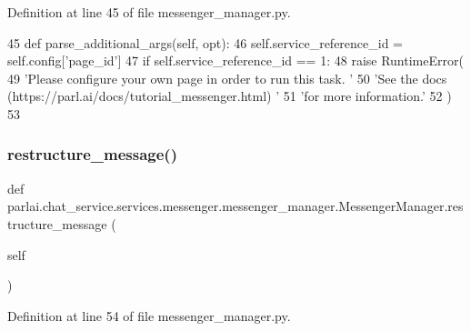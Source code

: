 Definition at line 45 of file messenger\+\_\+manager.\+py.


\begin{DoxyCode}
45     \textcolor{keyword}{def }parse\_additional\_args(self, opt):
46         self.service\_reference\_id = self.config[\textcolor{stringliteral}{'page\_id'}]
47         \textcolor{keywordflow}{if} self.service\_reference\_id == 1:
48             \textcolor{keywordflow}{raise} RuntimeError(
49                 \textcolor{stringliteral}{'Please configure your own page in order to run this task. '}
50                 \textcolor{stringliteral}{'See the docs (https://parl.ai/docs/tutorial\_messenger.html) '}
51                 \textcolor{stringliteral}{'for more information.'}
52             )
53 
\end{DoxyCode}
\mbox{\label{classparlai_1_1chat__service_1_1services_1_1messenger_1_1messenger__manager_1_1MessengerManager_aef9d4ef50c80aa22176d992f14da9747}} 
\subsubsection{\texorpdfstring{restructure\+\_\+message()}{restructure\_message()}}
{\footnotesize\ttfamily def parlai.\+chat\+\_\+service.\+services.\+messenger.\+messenger\+\_\+manager.\+Messenger\+Manager.\+restructure\+\_\+message (\begin{DoxyParamCaption}\item[{}]{self }\end{DoxyParamCaption})}



Definition at line 54 of file messenger\+\_\+manager.\+py.


